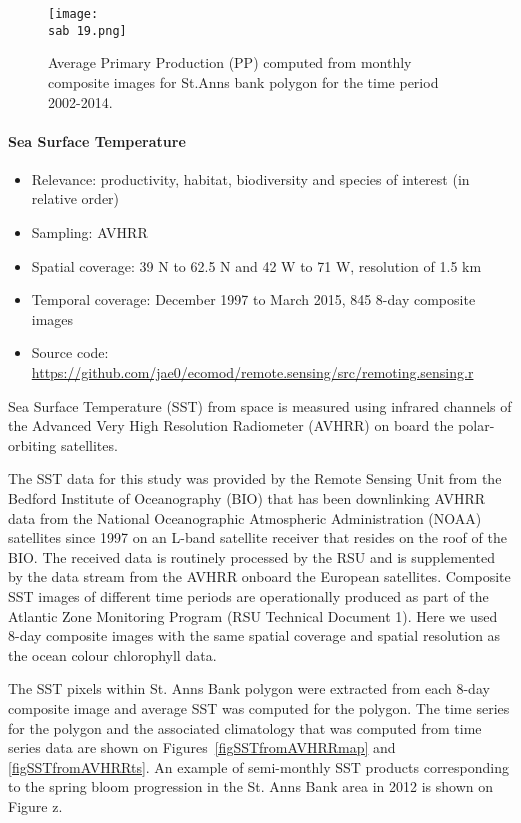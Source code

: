 \documentclass[letterpaper,portrait,11pt]{scrartcl}
\numberwithin{equation}{section}		%
\numberwithin{figure}{section}			%
\numberwithin{table}{section}				%
\newcommand{\ecomod}{\string~/ecomod_data/}   %
\newcommand{\sab}{\ecomod/mpa/sab/}   %
\begin{document}
\begin{figure}[h]
  \centering
  \texttt{[image: \\sab 19.png]}
  \caption{Average Primary Production (PP) computed from monthly composite images for St.Anns bank polygon for the time period 2002-2014.}
  \label{Figure x: }
\end{figure}


\paragraph{Sea Surface Temperature}


\begin{itemize}
  \item Relevance:  productivity, habitat, biodiversity and species of interest (in relative order)
  \item Sampling:  AVHRR
  \item Spatial coverage: 39 N to 62.5 N and 42 W to 71 W, resolution of 1.5 km
  \item Temporal coverage: December 1997 to March 2015, 845 8-day composite images
  \item Source code: \url{https://github.com/jae0/ecomod/remote.sensing/src/remoting.sensing.r}
\end{itemize}

Sea Surface Temperature (SST) from space is measured using infrared channels of the Advanced Very High Resolution Radiometer (AVHRR) on board the polar-orbiting satellites.

The SST data for this study was provided by the Remote Sensing Unit from the Bedford Institute of Oceanography (BIO) that has been downlinking AVHRR data from the National Oceanographic Atmospheric Administration (NOAA) satellites since 1997 on an L-band satellite receiver that resides on the roof of the BIO. The received data is routinely processed by the RSU and is supplemented by the data stream from the AVHRR onboard the European satellites. Composite SST images of different time periods are operationally produced as part of the Atlantic Zone Monitoring Program (RSU Technical Document 1). Here we used 8-day composite images with the same spatial coverage and spatial resolution as the ocean colour chlorophyll data.

The SST pixels within St. Anns Bank polygon were extracted from each 8-day composite image and average SST was computed for the polygon. The time series for the polygon and the associated climatology that was computed from time series data are shown on Figures~\ref{figSSTfromAVHRRmap} and \ref{figSSTfromAVHRRts}. An example of semi-monthly SST products corresponding to the spring bloom progression in the St. Anns Bank area in 2012 is shown on Figure z.
\end{document}
